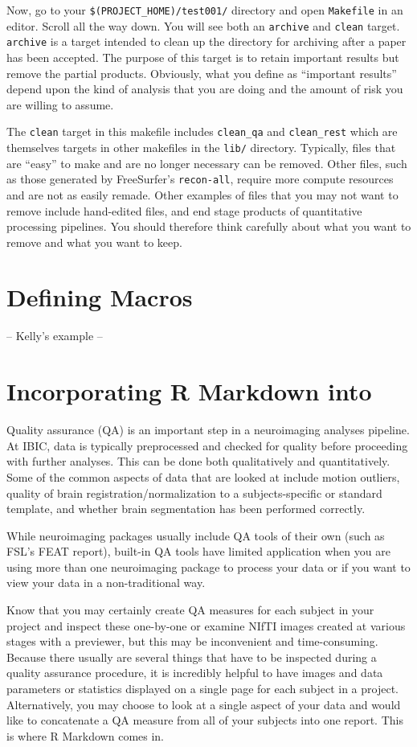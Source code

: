 Now, go to your \texttt{\$(PROJECT_HOME)/test001/} directory and open \texttt{Makefile} in an editor. Scroll all the way down. You will see both an \texttt{archive} and \texttt{clean} target. \texttt{archive} is a target intended to clean up the directory for archiving after a paper has been accepted. The purpose of this target is to retain important results but remove the partial products. Obviously, what you define as ``important results'' depend upon the kind of analysis that you are doing and the amount of risk you are willing to assume.

The \texttt{clean} target in this makefile includes \texttt{clean_qa} and \texttt{clean_rest} which are themselves targets in other makefiles in the \texttt{lib/} directory. Typically, files that are ``easy'' to make and are no longer necessary can be removed. Other files, such as those generated by FreeSurfer's \texttt{recon-all}, require more compute resources and are not as easily remade. Other examples of files that you may not want to remove include hand-edited files, and end stage products of quantitative processing pipelines. You should therefore think carefully about what you want to remove and what you want to keep. 

\section{Defining Macros}
-- Kelly's example --


\section{Incorporating R Markdown into \maken{}}

Quality assurance (QA) is an important step in a neuroimaging analyses pipeline. At IBIC, data is typically preprocessed and checked for quality before proceeding with further analyses. This can be done both qualitatively and quantitatively. Some of the common aspects of data that are looked at include motion outliers, quality of brain registration/normalization to a subjects-specific or standard template, and whether brain segmentation has been performed correctly. 

While neuroimaging packages usually include QA tools of their own (such as FSL's FEAT report), built-in QA tools have limited application when you are using more than one neuroimaging package to process your data or if you want to view your data in a non-traditional way. 

Know that you may certainly create QA measures for each subject in your project and inspect these one-by-one or examine NIfTI images created at various stages with a previewer, but this may be inconvenient and time-consuming. Because there usually are several things that have to be inspected during a quality assurance procedure, it is incredibly helpful to have images and data parameters or statistics displayed on a single page for each subject in a project. Alternatively, you may choose to look at a single aspect of your data and would like to concatenate a QA measure from all of your subjects into one report. This is where R Markdown comes in.

